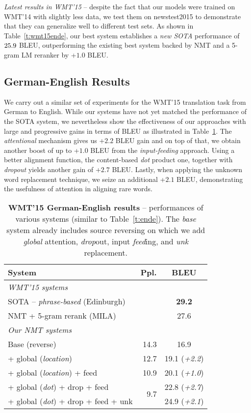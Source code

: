 {\it Latest results in WMT'15} -- despite the fact that our models were trained
on WMT'14 with slightly less data, we test them on newstest2015 to demonstrate
that they can generalize well to different test sets. As shown in Table~\ref{t:wmt15ende}, our best
system establishes a {\it new SOTA} performance of $25.9{}$ BLEU,
outperforming the existing best system backed by NMT and a 5-gram LM reranker
by +$1.0$
BLEU.

\subsection{German-English Results}
We carry out a similar set of experiments for the WMT'15 translation task from German
to English. 
While our systems have not yet matched the performance of the 
SOTA system, we nevertheless show the effectiveness of our
approaches with large and progressive gains in terms of BLEU as illustrated in
Table~\ref{t:deen}. 
The {\it attentional} mechanism gives us +$2.2$ BLEU gain and on top of that, we
obtain another boost of up to +$1.0$ BLEU from the {\it input-feeding} approach.
Using a better alignment function, the content-based {\it dot} product one,
together with {\it dropout} yields another gain of +$2.7$ BLEU. Lastly, when
applying the unknown word replacement technique, we seize an additional +$2.1$
BLEU, demonstrating the usefulness of attention in aligning rare words.
\begin{table}
\centering
\begin{tabular}{l|r|c}
\bf{System} & \bf{Ppl.} & \bf{BLEU}\\
  \hline
\multicolumn{3}{l}{{\it WMT'15 systems}}\\
  \hline
SOTA -- {\it phrase-based} (Edinburgh) &  & {\bf 29.2}\\ %
NMT + 5-gram rerank (MILA) &  & 27.6\\ %
  \hline
\multicolumn{3}{l}{{\it Our NMT systems}}\\
  \hline
Base (reverse) & 14.3 & 16.9\\
  \hdashline
+ global ({\it location}) & 12.7 & 19.1 ({\it +2.2}) \\
+ global ({\it location}) + feed & 10.9 & 20.1 ({\it +1.0})\\
  \hdashline
+ global ({\it dot}) + drop + feed & \multirow{ 2}{*}{9.7} & 22.8 ({\it +2.7})\\
+ global ({\it dot}) + drop + feed + unk &  & 24.9 ({\it +2.1})\\
\end{tabular}
\caption[WMT'15 German-English results]{{\bf WMT'15 German-English results} -- 
performances of various systems (similar to 
Table~\ref{t:ende}). The {\it base} system already includes source reversing
on which we add {\it global} attention, {\it drop}out, input {\it feed}ing, and
{\it unk} replacement.}
\label{t:deen}
\end{table}


